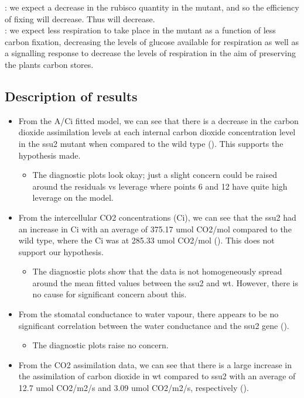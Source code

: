 \documentclass[
]{article}
\begin{document}
{}: we expect a decrease in the rubisco quantity in the mutant, and so
the efficiency of fixing will decrease. Thus {} will decrease.\\
{}: we expect less respiration to take place in the mutant as a function
of less carbon fixation, decreasing the levels of glucose available for
respiration as well as a signalling response to decrease the levels of
respiration in the aim of preserving the plant\textquotesingle s carbon
stores.

\subsection{Description of results}\label{description-of-results}

\begin{itemize}
\tightlist
\item
  From the A/Ci fitted model, we can see that there is a decrease in the
  carbon dioxide assimilation levels at each internal carbon dioxide
  concentration level in the ssu2 mutant when compared to the wild type
  ({}). This supports the hypothesis made.

  \begin{itemize}
  \tightlist
  \item
    The diagnostic plots look okay; just a slight concern could be
    raised around the residuals vs leverage where points 6 and 12 have
    quite high leverage on the model.
  \end{itemize}
\item
  From the intercellular CO2 concentrations (Ci), we can see that the
  ssu2 had an increase in Ci with an average of 375.17 umol CO2/mol
  compared to the wild type, where the Ci was at 285.33 umol CO2/mol
  ({}). This does not support our hypothesis.

  \begin{itemize}
  \tightlist
  \item
    The diagnostic plots show that the data is not homogeneously spread
    around the mean fitted values between the ssu2 and wt. However,
    there is no cause for significant concern about this.
  \end{itemize}
\item
  From the stomatal conductance to water vapour, there appears to be no
  significant correlation between the water conductance and the ssu2
  gene ({}).

  \begin{itemize}
  \tightlist
  \item
    The diagnostic plots raise no concern.
  \end{itemize}
\item
  From the CO2 assimilation data, we can see that there is a large
  increase in the assimilation of carbon dioxide in wt compared to ssu2
  with an average of 12.7 umol CO2/m2/s and 3.09 umol CO2/m2/s,
  respectively ({}).


\end{itemize}
\end{document}
